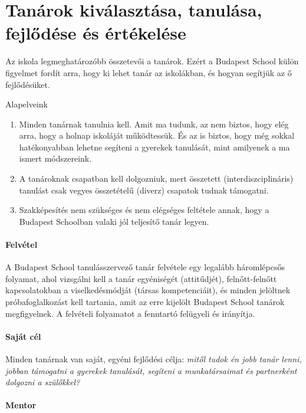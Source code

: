 \section{Tanárok kiválasztása, tanulása, fejlődése és értékelése}

Az iskola legmeghatározóbb összetevői a tanárok.
Ezért a Budapest School külön figyelmet fordít arra, hogy ki lehet tanár az
iskolákban, és hogyan segítjük az ő fejlődésüket.

Alapelveink
\begin{enumerate}
  \item Minden tanárnak tanulnia kell. Amit ma tudunk, az nem biztos, hogy elég
        arra, hogy a holnap iskoláját működtessük. És az is biztos, hogy még sokkal
        hatékonyabban lehetne segíteni a gyerekek tanulását, mint amilyenek a ma ismert
        módszereink.

  \item A tanároknak csapatban kell dolgozniuk, mert összetett
        (interdiszciplináris) tanulást csak vegyes összetételű (diverz) csapatok tudnak
        támogatni.

  \item Szakképesítés nem szükséges és nem elégséges feltétele annak, hogy a
        Budapest Schoolban valaki jól teljesítő tanár legyen.
\end{enumerate}

\paragraph{Felvétel}
A Budapest School tanulásszervező tanár felvétele egy legalább háromlépcsős
folyamat, ahol vizsgálni kell a tanár egyéniségét (attitűdjét), felnőtt-felnőtt
kapcsolatokban a viselkedésmódját (társas kompetenciáit), és minden jelöltnek
próbafoglalkozást kell tartania, amit az erre kijelölt Budapest School tanárok
megfigyelnek. A felvételi folyamatot a fenntartó felügyeli és irányítja.

\paragraph{Saját cél}

Minden tanárnak van saját, egyéni fejlődési célja: \emph{mitől tudok én jobb
  tanár lenni, jobban támogatni a gyerekek tanulását, segíteni a munkatársaimat
  és partnerként dolgozni a szülőkkel?}

\paragraph{Mentor}

